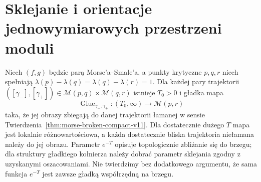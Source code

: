 \section{Sklejanie i orientacje jednowymiarowych przestrzeni moduli}
\begin{twierdzenie}
\label{thm:morse-gluing-v11}
Niech $(f,g)$ będzie parą Morse'a--Smale'a, a punkty
krytyczne $p,q,r$ niech spełniają
$\lambda(p)-\lambda(q)=\lambda(q)-\lambda(r)=1$.
Dla każdej pary trajektorii
$([\gamma_-],[\gamma_+])\in
\mathcal M(p,q)\times\mathcal M(q,r)$
istnieje $T_0>0$ i gładka mapa
\[
\operatorname{Glue}_{\gamma_-,\gamma_+}:
(T_0,\infty)\longrightarrow\mathcal M(p,r)
\]
taka, że jej obrazy zbiegają do danej trajektorii łamanej
w sensie Twierdzenia~\ref{thm:morse-broken-compact-v11}.
Dla dostatecznie dużego $T$ mapa jest lokalnie różnowartościowa,
a każda dostatecznie bliska trajektoria niełamana należy do
jej obrazu. Parametr $e^{-T}$ opisuje topologicznie zbliżanie się do
brzegu; dla struktury gładkiego kołnierza należy dobrać
parametr sklejania zgodny z uzyskanymi oszacowaniami.
Nie twierdzimy bez dodatkowego argumentu, że sama funkcja
$e^{-T}$ jest zawsze gładką współrzędną na brzegu.
\end{twierdzenie}
